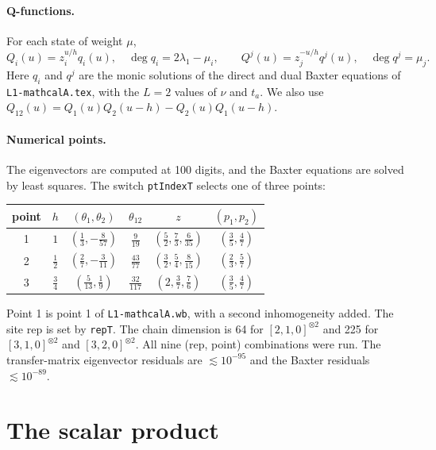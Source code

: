 \documentclass[11pt]{article}
\newcommand{\nb}[1]{\texttt{#1}}
\theoremstyle{definition}
\theoremstyle{remark}
\begin{document}
\paragraph{Q-functions.}
For each state of weight $\mu$,
\begin{equation}
Q_i(u)=z_i^{u/h}q_i(u),\quad\deg q_i=2\lambda_1-\mu_i,\qquad Q^j(u)=z_j^{-u/h}q^j(u),\quad\deg q^j=\mu_j .
\end{equation}
Here $q_i$ and $q^j$ are the monic solutions of the direct and dual Baxter equations of \nb{L1-mathcalA.tex}, with the $L=2$ values of $\nu$ and $t_a$. We also use $Q_{12}(u)=Q_1(u)Q_2(u-h)-Q_2(u)Q_1(u-h)$.

\paragraph{Numerical points.}
The eigenvectors are computed at 100 digits, and the Baxter equations are solved by least squares. The switch \nb{ptIndexT} selects one of three points:
\begin{center}
\begin{tabular}{cccccc}\toprule
point & $h$ & $(\theta_1,\theta_2)$ & $\theta_{12}$ & $z$ & $(p_1,p_2)$\\\midrule
1 & $1$ & $(\tfrac13,-\tfrac8{57})$ & $\tfrac9{19}$ & $(\tfrac52,\tfrac73,\tfrac6{35})$ & $(\tfrac35,\tfrac47)$\\
2 & $\tfrac12$ & $(\tfrac27,-\tfrac3{11})$ & $\tfrac{43}{77}$ & $(\tfrac32,\tfrac54,\tfrac8{15})$ & $(\tfrac23,\tfrac57)$\\
3 & $\tfrac34$ & $(\tfrac5{13},\tfrac19)$ & $\tfrac{32}{117}$ & $(2,\tfrac37,\tfrac76)$ & $(\tfrac35,\tfrac47)$\\\bottomrule
\end{tabular}
\end{center}
Point 1 is point 1 of \nb{L1-mathcalA.wb}, with a second inhomogeneity added. The site rep is set by \nb{repT}. The chain dimension is 64 for $[2,1,0]^{\otimes2}$ and 225 for $[3,1,0]^{\otimes2}$ and $[3,2,0]^{\otimes2}$. All nine (rep, point) combinations were run. The transfer-matrix eigenvector residuals are ${\lesssim}10^{-95}$ and the Baxter residuals ${\lesssim}10^{-89}$.

\section{The scalar product}\label{sec:sp}
\end{document}
